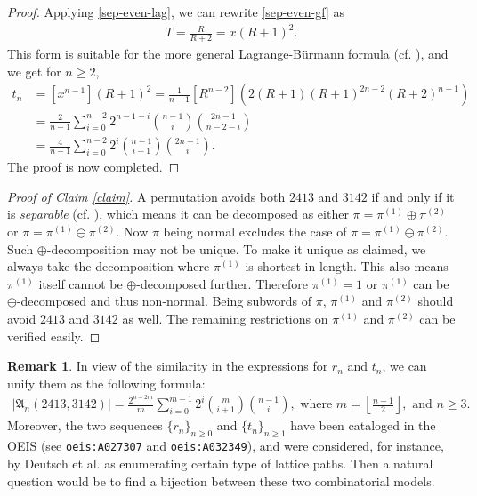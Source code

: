 \documentclass[12pt,reqno]{amsart}
\numberwithin{equation}{section}
\theoremstyle{plain}
\theoremstyle{definition}
\newtheorem{remark}[theorem]{Remark}
\def\A{\mathfrak{A}}
\begin{document}
\begin{proof}
Applying \eqref{sep-even-lag}, we can rewrite \eqref{sep-even-gf} as
\begin{align*}
T=\frac{R}{R+2}=x(R+1)^2.
\end{align*}
This form is suitable for the more general Lagrange-B\"urmann formula (cf. \cite{FSe}), and we get for $n\ge 2$,
\begin{align*}
t_n&=[x^{n-1}](R+1)^2=\frac{1}{n-1}[R^{n-2}]\left(2(R+1)(R+1)^{2n-2}(R+2)^{n-1}\right)\\
&=\frac{2}{n-1}\sum_{i=0}^{n-2}2^{n-1-i}\binom{n-1}{i}\binom{2n-1}{n-2-i}\\
&=\frac{4}{n-1}\sum_{i=0}^{n-2}2^i\binom{n-1}{i+1}\binom{2n-1}{i}.
\end{align*}
The proof is now completed.
\end{proof}

\begin{proof}[Proof of Claim \ref{claim}]
A permutation avoids both $2413$ and $3142$ if and only if it is \emph{separable} (cf. \cite[page 57]{Kit}), which means it can be decomposed as either $\pi=\pi^{(1)}\oplus\pi^{(2)}$ or $\pi=\pi^{(1)}\ominus\pi^{(2)}$. Now $\pi$ being normal excludes the case of $\pi=\pi^{(1)}\ominus\pi^{(2)}$. Such $\oplus$-decomposition may not be unique. To make it unique as claimed, we always take the decomposition where $\pi^{(1)}$ is shortest in length. This also means $\pi^{(1)}$ itself cannot be $\oplus$-decomposed further. Therefore $\pi^{(1)}=1$ or $\pi^{(1)}$ can be $\ominus$-decomposed and thus non-normal. Being subwords of $\pi$, $\pi^{(1)}$ and $\pi^{(2)}$ should avoid $2413$ and $3142$ as well. The remaining restrictions on $\pi^{(1)}$ and $\pi^{(2)}$ can be verified easily.
\end{proof}

\begin{remark}
In view of the similarity in the expressions for $r_n$ and $t_n$, we can unify them as the following formula:
\begin{align*}
|\A_n(2413,3142)|=\frac{2^{n-2m}}{m}\sum_{i=0}^{m-1}2^i\binom{m}{i+1}\binom{n-1}{i}, \text{ where }m=\left\lfloor\frac{n-1}{2}\right\rfloor, \text{ and }n\ge 3.
\end{align*}
Moreover, the two sequences $\{r_n\}_{n\ge 0}$ and $\{t_n\}_{n\ge 1}$ have been cataloged in the OEIS (see \href{https://oeis.org/A027307}{\tt{oeis:A027307}} and \href{https://oeis.org/A032349}{\tt{oeis:A032349}}), and were considered, for instance, by Deutsch et al. \cite{DC} as enumerating certain type of lattice paths. Then a natural question would be to find a bijection between these two combinatorial models.
\end{remark}
\end{document}

